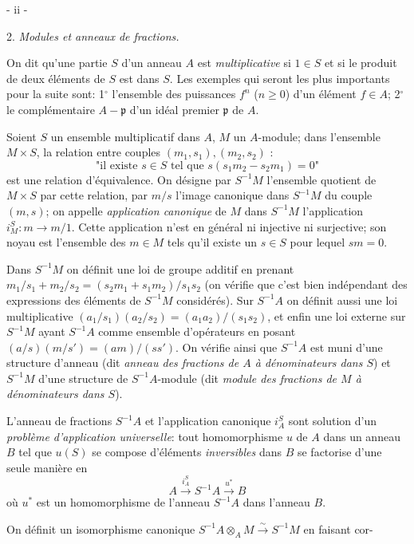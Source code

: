 \begin{center}
- ii -
\end{center}

2. \emph{Modules et anneaux de fractions.}

On dit qu'une partie $S$ d'un anneau $A$ est \emph{multiplicative} si $1 \in S$ et si le produit de deux éléments de $S$ est dans $S$. Les exemples qui seront les plus importants pour la suite sont: 1$^\circ$ l'ensemble des puissances $f^n$ ($n \geq 0$) d'un élément $f \in A$; 2$^\circ$ le complémentaire $A - \mathfrak{p}$ d'un idéal premier $\mathfrak{p}$ de $A$.

Soient $S$ un ensemble multiplicatif dans $A$, $M$ un $A$-module; dans l'ensemble $M \times S$, la relation entre couples $(m_1, s_1), (m_2, s_2)$ :
$$ \text{"il existe } s \in S \text{ tel que } s(s_1 m_2 - s_2 m_1) = 0 \text{"} $$
est une relation d'équivalence. On désigne par $S^{-1}M$ l'ensemble quotient de $M \times S$ par cette relation, par $m/s$ l'image canonique dans $S^{-1}M$ du couple $(m, s)$; on appelle \emph{application canonique} de $M$ dans $S^{-1}M$ l'application $i_M^S : m \to m/1$. Cette application n'est en général ni injective ni surjective; son noyau est l'ensemble des $m \in M$ tels qu'il existe un $s \in S$ pour lequel $sm = 0$.

Dans $S^{-1}M$ on définit une loi de groupe additif en prenant $m_1/s_1 + m_2/s_2 = (s_2 m_1 + s_1 m_2)/s_1 s_2$ (on vérifie que c'est bien indépendant des expressions des éléments de $S^{-1}M$ considérés). Sur $S^{-1}A$ on définit aussi une loi multiplicative $(a_1/s_1)(a_2/s_2) = (a_1 a_2)/(s_1 s_2)$, et enfin une loi externe sur $S^{-1}M$ ayant $S^{-1}A$ comme ensemble d'opérateurs en posant $(a/s)(m/s') = (am)/(ss')$. On vérifie ainsi que $S^{-1}A$ est muni d'une structure d'anneau (dit \emph{anneau des fractions de $A$ à dénominateurs dans $S$}) et $S^{-1}M$ d'une structure de $S^{-1}A$-module (dit \emph{module des fractions de $M$ à dénominateurs dans $S$}).

L'anneau de fractions $S^{-1}A$ et l'application canonique $i_A^S$ sont solution d'un \emph{problème d'application universelle}: tout homomorphisme $u$ de $A$ dans un anneau $B$ tel que $u(S)$ se compose d'éléments \emph{inversibles} dans $B$ se factorise d'une seule manière en
$$ A \xrightarrow{i_A^S} S^{-1}A \xrightarrow{u^*} B $$
où $u^*$ est un homomorphisme de l'anneau $S^{-1}A$ dans l'anneau $B$.

On définit un isomorphisme canonique $S^{-1}A \otimes_A M \xrightarrow{\sim} S^{-1}M$ en faisant cor-

